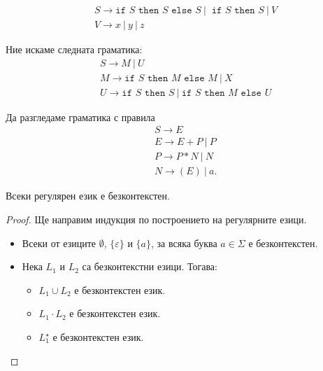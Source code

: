 \begin{example}
  \begin{align*}
    & S \to \texttt{if } S \texttt{ then } S \texttt{ else }S\ |\ \texttt{ if }S \texttt{ then }S\ |\ V\\
    & V \to x\ |\ y\ |\ z
  \end{align*}

  Ние искаме следната граматика:
  \begin{align*}
    & S \to M\ |\ U\\
    & M \to \texttt{if } S \texttt{ then } M \texttt{ else }M\ |\ X\\
    & U \to \texttt{if } S \texttt{ then } S\ |\ \texttt{if } S \texttt{ then } M \texttt{ else }U
  \end{align*}
\end{example}

\begin{example}
  Да разгледаме граматика с правила
  \begin{align*}
    & S \to E\\
    & E \to E + P\ |\ P\\
    & P \to P * N\ |\ N\\
    & N \to (E)\ |\ a.
  \end{align*}
\end{example}

\begin{framed}
  \begin{thm}
    Всеки регулярен език е безконтекстен.
  \end{thm}
\end{framed}
\begin{proof}
  Ще направим индукция по построението на регулярните езици.
  \begin{itemize}
  \item
    Всеки от езиците $\emptyset$, $\{\varepsilon\}$ и $\{a\}$, за всяка буква $a \in \Sigma$ е безконтекстен.
  \item
    Нека $L_1$ и $L_2$ са безконтекстни езици. Тогава:
    \begin{itemize}
    \item
      $L_1 \cup L_2$ е безконтекстен език.
    \item
      $L_1 \cdot L_2$ е безконтекстен език.
    \item
      $L^\star_1$ е безконтекстен език.
    \end{itemize}
  \end{itemize}
\end{proof}


